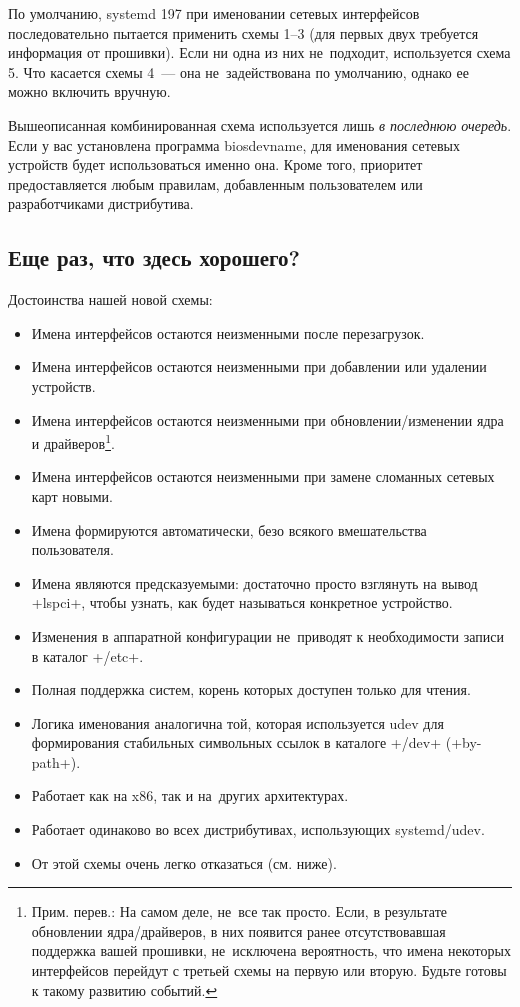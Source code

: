 \documentclass[10pt,oneside,a4paper]{article}
\begin{document}
По умолчанию, systemd 197 при именовании сетевых интерфейсов последовательно
пытается применить схемы 1--3 (для первых двух требуется информация от
прошивки). Если ни одна из них не~подходит, используется схема 5. Что касается
схемы 4~--- она не~задействована по умолчанию, однако ее можно включить вручную.

Вышеописанная комбинированная схема используется лишь \emph{в последнюю
очередь}. Если у вас установлена программа biosdevname, для именования сетевых
устройств будет использоваться именно она. Кроме того, приоритет предоставляется
любым правилам, добавленным пользователем или разработчиками дистрибутива.

\subsection{Еще раз, что здесь хорошего?}

Достоинства нашей новой схемы:
\begin{itemize}
	\item Имена интерфейсов остаются неизменными после перезагрузок.
	\item Имена интерфейсов остаются неизменными при добавлении или
		удалении устройств.
	\item Имена интерфейсов остаются неизменными при обновлении/изменении
		ядра и драйверов\footnote{Прим. перев.: На самом деле, не~все
		так просто. Если, в результате обновлении ядра/драйверов, в них
		появится ранее отсутствовавшая поддержка вашей прошивки,
		не~исключена вероятность, что имена некоторых интерфейсов
		перейдут с третьей схемы на первую или вторую. Будьте готовы к
		такому развитию событий.}.
	\item Имена интерфейсов остаются неизменными при замене сломанных
		сетевых карт новыми.
	\item Имена формируются автоматически, безо всякого вмешательства
		пользователя.
	\item Имена являются предсказуемыми: достаточно просто взглянуть на
		вывод +lspci+, чтобы узнать, как будет называться конкретное
		устройство.
	\item Изменения в аппаратной конфигурации не~приводят к необходимости
		записи в каталог +/etc+.
	\item Полная поддержка систем, корень которых доступен только
		для чтения.
	\item Логика именования аналогична той, которая используется
		udev для формирования стабильных символьных ссылок в каталоге
		+/dev+ (+by-path+).
	\item Работает как на x86, так и на~других архитектурах.
	\item Работает одинаково во всех дистрибутивах, использующих
		systemd/udev.
	\item От этой схемы очень легко отказаться (см. ниже).
\end{itemize}
\end{document}
